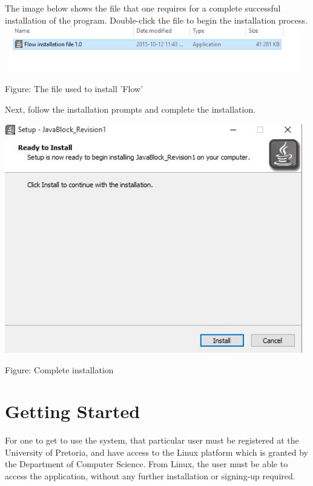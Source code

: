 \documentclass[11pt,a4paper,titlepage]{article}
\begin{document}
		The image below shows the file that one requires for a complete successful installation of the program. Double-click the file to begin the installation process. \newline \newline
		\includegraphics[width=13cm, height=2cm]{Install1.jpg}		
		\begin{center}
		Figure: The file used to install 'Flow'
		\end{center}
		
			
		Next, follow the installation prompts and complete the installation. \newline
		
		\includegraphics[width=13cm]{Install2.jpg}		
		\begin{center}
		Figure: Complete installation
		\end{center}

\section{Getting Started}
	
	For one to get to use the system, that particular user must be registered at the University of Pretoria, and have access to the Linux platform which is granted by the Department of Computer Science. From Linux, the user must be able to access the application, without any further installation or signing-up required.
\end{document}
